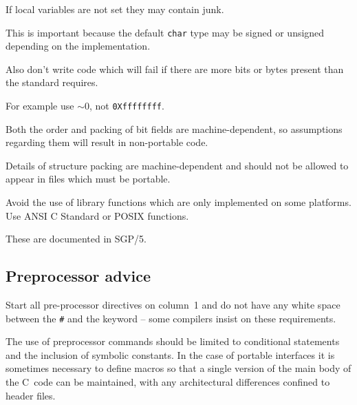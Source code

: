If local variables are not set they may contain junk.

This is important because 
the default {\tt char} type may be signed 
or unsigned depending on the implementation.


Also don't write code which will fail if there are more bits or bytes present 
than the standard requires.


For example use {\tt$\sim0$}, not {\tt 0Xffffffff}.


Both the order and packing of bit fields are machine-dependent, so 
assumptions regarding them will result in non-portable code.

Details of structure packing are machine-dependent and should not be allowed 
to appear in files which must be portable.

Avoid the use of library functions which are only implemented 
on some platforms. Use ANSI C Standard or POSIX functions.

These are documented in SGP/5.

\subsection{Preprocessor advice}


Start all pre-processor directives on column~1 and do not have any white
space between the {\tt \#} and the keyword -- some compilers insist on 
these requirements.

The use of preprocessor commands should be limited to conditional 
statements and the inclusion of symbolic constants.
In the case of portable interfaces it is sometimes necessary to define
macros so that a single version of the main body of the C~code can be 
maintained,
with any architectural differences confined to header files.

